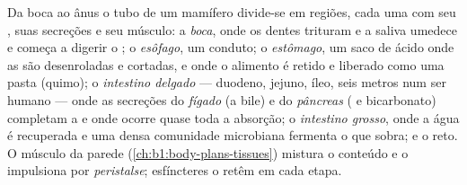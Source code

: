 \begin{proposition}\label{prop:b1:digestion-absorption:tract}
Da boca ao ânus o tubo de um mamífero divide-se em regiões, cada uma
com seu , suas secreções e seu músculo: a \emph{boca}, onde os
dentes trituram e a saliva umedece e começa a digerir o ; o
\emph{esôfago}, um conduto; o \emph{estômago}, um saco de ácido onde as
 são desenroladas e cortadas, e onde o alimento é retido e
liberado como uma pasta (quimo); o \emph{intestino delgado} ---
duodeno, jejuno, íleo, seis metros num ser humano --- onde as secreções
do \emph{fígado} (a bile) e do \emph{pâncreas} ( e bicarbonato)
completam a  e onde ocorre quase toda a absorção; o
\emph{intestino grosso}, onde a água é recuperada e uma densa
comunidade microbiana fermenta o que sobra; e o reto. O músculo da
parede (\cref{ch:b1:body-plans-tissues}) mistura o conteúdo e o
impulsiona por \emph{peristalse}; esfíncteres o retêm em cada etapa.
\end{proposition}

